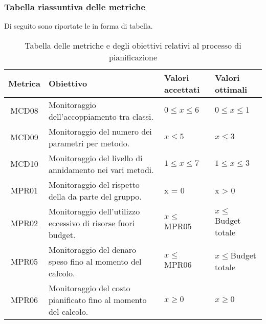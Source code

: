 \subsubsection{Tabella riassuntiva delle metriche}
Di seguito sono riportate le  in forma di tabella.
\begin{table}[H]
		\begin{center}
			\setlength{\aboverulesep}{0pt}
			\setlength{\belowrulesep}{0pt}
			\setlength{\extrarowheight}{.75ex}
			\begin{tabular}{ c C{6cm} C{3cm} C{3cm} }
				\textbf{Metrica} & \textbf{Obiettivo} & \textbf{Valori accettati} & \textbf{Valori ottimali}  \\
				\toprule
				MCD08 & Monitoraggio dell'accoppiamento tra classi. & $ 0 \leq x \leq 6$ & $ 0 \leq x \leq 1$  \\
				MCD09 & Monitoraggio del numero dei parametri per metodo. & $x \leq 5$ & $x \leq 3 $\\ 
				MCD10 & Monitoraggio del livello di annidamento nei vari metodi. & $1 \leq x \leq 7 $ & $1 \leq x \leq 3$ \\	
				
				MPR01 & Monitoraggio del rispetto della  da parte del gruppo. \gruppo{} & x = 0 & x > 0 \\
				
				MPR02 & Monitoraggio dell'utilizzo eccessivo di risorse fuori budget. & $ x \leq$ MPR05 & $ x \leq$ Budget totale \\
				
				MPR05 & Monitoraggio del denaro speso fino al momento del calcolo. & $ x \leq $ MPR06 & $x \leq $Budget totale  \\
				
				MPR06 & Monitoraggio del costo pianificato fino al momento del calcolo. & $ x \geq 0$ & $x \geq 0$\\		
				

				\bottomrule
			\end{tabular}
			\caption{Tabella delle metriche e degli obiettivi relativi al processo di pianificazione}
		\end{center}
	\end{table}



